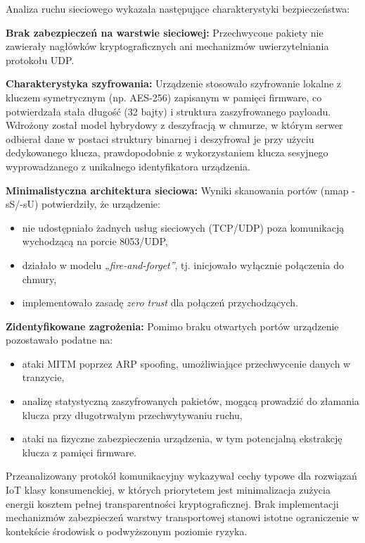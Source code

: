 Analiza ruchu sieciowego wykazała następujące charakterystyki bezpieczeństwa:

\textbf{Brak zabezpieczeń na warstwie sieciowej:}  
Przechwycone pakiety nie zawierały nagłówków kryptograficznych ani mechanizmów uwierzytelniania protokołu UDP.

\textbf{Charakterystyka szyfrowania:}  
Urządzenie stosowało szyfrowanie lokalne z kluczem symetrycznym (np. AES-256) zapisanym w pamięci firmware, co potwierdzała stała długość (32 bajty) i struktura zaszyfrowanego payloadu. Wdrożony został model hybrydowy z deszyfracją w chmurze, w którym serwer odbierał dane w postaci struktury binarnej i deszyfrował je przy użyciu dedykowanego klucza, prawdopodobnie z wykorzystaniem klucza sesyjnego wyprowadzanego z unikalnego identyfikatora urządzenia.

\textbf{Minimalistyczna architektura sieciowa:}  
Wyniki skanowania portów (nmap -sS/-sU) potwierdziły, że urządzenie:
\begin{itemize}
    \item nie udostępniało żadnych usług sieciowych (TCP/UDP) poza komunikacją wychodzącą na porcie 8053/UDP,
    \item działało w modelu \textit{„fire-and-forget”}, tj. inicjowało wyłącznie połączenia do chmury,
    \item implementowało zasadę \textit{zero trust} dla połączeń przychodzących.
\end{itemize}

\textbf{Zidentyfikowane zagrożenia:}  
Pomimo braku otwartych portów urządzenie pozostawało podatne na:
\begin{itemize}
    \item ataki MITM poprzez ARP spoofing, umożliwiające przechwycenie danych w tranzycie,
    \item analizę statystyczną zaszyfrowanych pakietów, mogącą prowadzić do złamania klucza przy długotrwałym przechwytywaniu ruchu,
    \item ataki na fizyczne zabezpieczenia urządzenia, w tym potencjalną ekstrakcję klucza z pamięci firmware.
\end{itemize}

Przeanalizowany protokół komunikacyjny wykazywał cechy typowe dla rozwiązań IoT klasy konsumenckiej, w których priorytetem jest minimalizacja zużycia energii kosztem pełnej transparentności kryptograficznej. Brak implementacji mechanizmów zabezpieczeń warstwy transportowej stanowi istotne ograniczenie w kontekście środowisk o podwyższonym poziomie ryzyka.

